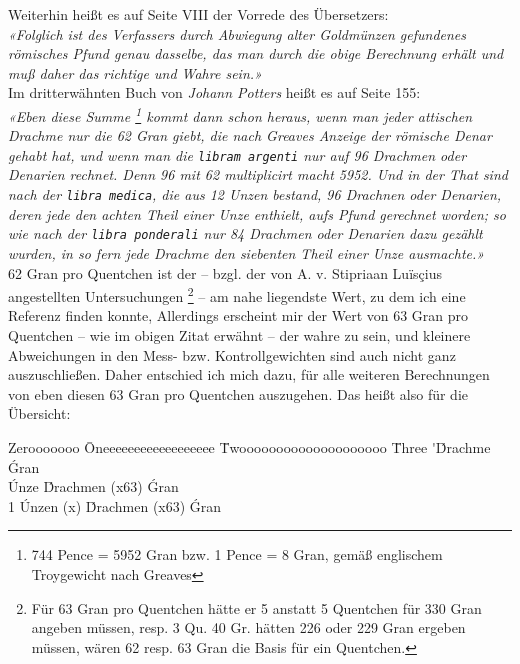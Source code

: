 \documentclass[a5paper,fontsize=10pt]{memoir}
\newcommand\ouncesofpound{12}
\newcommand\quentinsofounce{8}
\newcommand\gransofquentins{63}
\begin{document}
Weiterhin heißt es auf Seite VIII der Vorrede des Übersetzers:\\

\emph{«Folglich ist des Verfassers durch Abwiegung
alter Goldmünzen gefundenes römisches Pfund genau dasselbe,
das man durch die obige Berechnung erhält
und muß daher das richtige und Wahre sein.»}\\

Im dritterwähnten Buch von \emph{Johann Potters}
heißt es auf Seite 155:\\

\emph{«Eben diese Summe%
\footnote{744 Pence = 5952 Gran bzw. 1 Pence = 8 Gran,
gemäß englischem Troygewicht nach Greaves}
kommt dann schon heraus,
wenn man jeder attischen Drachme nur die 62 Gran giebt,
die nach Greaves Anzeige der römische Denar gehabt hat,
und wenn man die \texttt{libram argenti} nur auf 96 Drachmen
oder Denarien rechnet.
Denn 96 mit 62 multiplicirt macht 5952.
Und in der That sind nach der \texttt{libra medica},
die aus 12 Unzen bestand, 96 Drachnen oder Denarien,
deren jede den achten Theil einer Unze enthielt,
aufs Pfund gerechnet worden;
so wie nach der \texttt{libra ponderali} nur 84 Drachmen
oder Denarien dazu gezählt wurden,
in so fern jede Drachme den siebenten Theil einer Unze ausmachte.»}\\

62 Gran pro Quentchen ist der
-- bzgl. der von A. v. Stipriaan Luïsçius angestellten Untersuchungen%
\footnote{Für 63 Gran pro Quentchen
hätte er 5 anstatt 5 Quentchen
für 330 Gran angeben müssen,
resp. 3 Qu. 40 Gr. hätten 226 oder 229 Gran ergeben müssen,
wären 62 resp. 63 Gran die Basis für ein Quentchen.}%
-- am nahe liegendste Wert,
zu dem ich eine Referenz finden konnte,
Allerdings erscheint mir der Wert von 63 Gran pro Quentchen --
wie im obigen Zitat erwähnt --
der wahre zu sein,
und kleinere Abweichungen in den Mess- bzw. Kontrollgewichten
sind auch nicht ganz auszuschließen. Daher entschied ich mich dazu,
für alle weiteren Berechnungen 
von eben diesen 63 Gran pro Quentchen auszugehen. 
Das heißt also für die Übersicht:\\

\noindent
\begin{minipage}{\linewidth}
\begin{tabbing}
Zerooooooo \= Oneeeeeeeeeeeeeeeeee \= Twoooooooooooooooooooo \= Three      \kill
           \>  \'                  \'Drachme             \>  \gransofquentins\'Gran \\
           \'Unze              \> \quentinsofounce\'Drachmen (x\gransofquentins)      \> \fpeval{\quentinsofounce * \gransofquentins}\'Gran \\
1 \Pfund   \>\ouncesofpound\'Unzen (x\fpeval{\quentinsofounce * \gransofquentins})      \>\fpeval{\ouncesofpound * \quentinsofounce}\'Drachmen (x\gransofquentins)      \>\fpeval{\ouncesofpound * \quentinsofounce * \gransofquentins}\'Gran \\
\end{tabbing}
\end{minipage}
\end{document}
